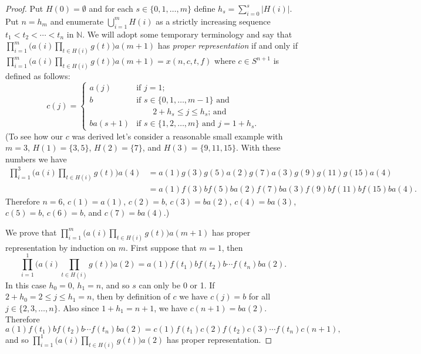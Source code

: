 \documentclass[12pt]{article}
\theoremstyle{plain}
\theoremstyle{definition}
\newcommand{\bbN}{\mathbb{N}}
\begin{document}
\begin{proof}
  Put $H(0) = \emptyset$ and for each $s \in \{0, 1, \ldots, m\}$ define $h_s = \sum_{i=0}^s |H(i)|$.
  Put $n = h_m$ and enumerate $\bigcup_{i=1}^m H(i)$ as a strictly increasing sequence $t_1 < t_2 < \cdots < t_n$ in $\bbN$. 
  We will adopt some temporary terminology and say that $\prod_{i=1}^m \bigl( a(i) \prod_{t \in H(i)} g(t) \bigr) a(m+1)$ has \textsl{proper representation} if and only if $\prod_{i=1}^m \bigl( a(i) \prod_{t \in H(i)} g(t) \bigr) a(m+1) = x(n, c, t, f)$ where $c \in S^{n+1}$ is defined as follows:
  \[
    c(j) = 
    \begin{cases}
      a(j) & \mbox{if $j = 1$;} \\
      b & \mbox{if $s \in \{0, 1, \ldots, m-1\}$ and} \\
      &   \hspace{2em}\mbox{$2+h_s \le j \le h_s$; and} \\
      ba(s+1) & \mbox{if $s \in \{1, 2, \ldots, m\}$ and $j = 1+h_s$.}
    \end{cases}
  \]
  {
    \small
    (To see how our $c$ was derived let's consider a reasonable small example with $m = 3$, $H(1) = \{3, 5\}$, $H(2) = \{7\}$, and $H(3) = \{9, 11, 15\}$.
    With these numbers we have
    \begin{align*}
      \textstyle
      \prod_{i=1}^3 \bigl( a(i) \prod_{t \in H(i)} g(t) \bigr) a(4) &=
      a(1) g(3)g(5) a(2) g(7) a(3) g(9)g(11)g(15) a(4) \\
      &= a(1) f(3)bf(5)b a(2) f(7)b a(3) f(9)bf(11)bf(15)b a(4).
    \end{align*}
    Therefore $n = 6$, $c(1) = a(1)$, $c(2) = b$, $c(3) = ba(2)$, $c(4) = ba(3)$, $c(5) = b$,  $c(6) = b$, and $c(7) = ba(4)$.)
  }

  We prove that $\prod_{i=1}^m \bigl( a(i) \prod_{t \in H(i)} g(t) \bigr) a(m+1)$ has proper representation by induction on $m$. 
  First suppose that $m = 1$, then 
  \[
    \textstyle
    \prod_{i=1}^1 \bigl( a(i) \prod_{t \in H(i)} g(t) \bigr) a(2) = a(1) f(t_1)b  f(t_2)b \cdots f(t_n)b a(2).
  \]
  In this case $h_0 = 0$, $h_1 = n$, and so $s$ can only be 0 or 1.
  If $2+h_0 = 2 \le j \le h_1 = n$, then by definition of $c$ we have $c(j) = b$ for all $j \in \{2, 3, \ldots, n\}$. 
  Also since $1 + h_1 = n+1$, we have $c(n+1) = ba(2)$. 
  Therefore
  \[
    \textstyle
    a(1) f(t_1)b  f(t_2)b \cdots f(t_n)b a(2) = c(1) f(t_1) c(2) f(t_2) c(3) \cdots f(t_n) c(n+1),
  \]
  and so $\prod_{i=1}^1 \bigl( a(i) \prod_{t \in H(i)} g(t) \bigr) a(2)$ has proper representation. 


\end{proof}
\end{document}
